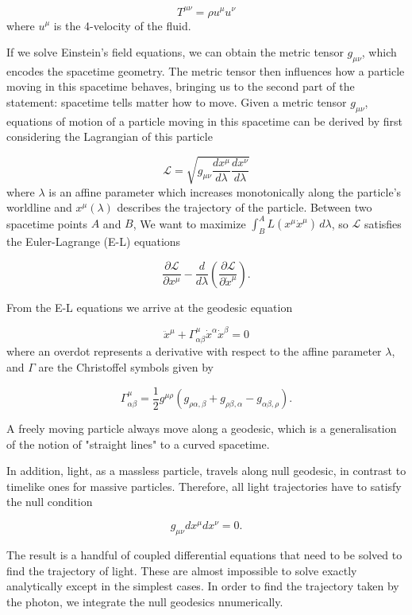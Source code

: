 \begin{equation}
  T^{\mu \nu} = \rho u^{\mu} u^{\nu}
\end{equation}
where $u^{\mu}$ is the 4-velocity of the fluid. 

If we solve Einstein's field equations, we can obtain the metric tensor $g_{\mu \nu}$, which encodes the spacetime geometry. The metric tensor then influences how a particle moving in this spacetime behaves, bringing us to the second part of the statement: spacetime tells matter how to move. Given a metric tensor $g_{\mu \nu}$, equations of motion of a particle moving in this spacetime can be derived by first considering the Lagrangian of this particle

\begin{equation}
  \mathcal{L} = \sqrt{g_{\mu \nu} \frac{dx^{\mu}}{d \lambda} \frac{dx^{\nu}}{d \lambda}}
\end{equation}
where $\lambda$ is an affine parameter which increases monotonically along the particle's worldline and $x^{\mu}(\lambda)$ describes the trajectory of the particle. Between two spacetime points $A$ and $B$, We want to maximize $\int^{A}_{B} L(x^{\mu} \dot{x}^{\mu})\, d \lambda$, so $\mathcal{L}$ satisfies the Euler-Lagrange (E-L) equations

\begin{equation}
  \frac{\partial \mathcal{L}}{\partial x^{\mu}} - \frac{d}{d \lambda}\left ( \frac{\partial \mathcal{L}}{\partial \dot{x}^{\mu}} \right ).
  \label{eq:euler-lagrange-eqn}
\end{equation}

From the E-L equations we arrive at the geodesic equation

\begin{equation}
  \ddot{x}^{\mu} + \Gamma^{\mu}_{\alpha \beta} \dot{x}^{\alpha} \dot{x}^{\beta} = 0 
  \label{eq:geodesic-eqn}
\end{equation}
where an overdot represents a derivative with respect to the affine parameter $\lambda$, and $\Gamma$ are the Christoffel symbols given by

\begin{equation}
  \Gamma^{\mu}_{\alpha \beta} = \frac{1}{2} g^{\mu \rho} (g_{\rho \alpha, \beta} + g_{\rho \beta, \alpha} - g_{\alpha \beta, \rho}).
  \label{eq:christoffels}
\end{equation}

A freely moving particle always move along a geodesic, which is a generalisation of the notion of "straight lines" to a curved spacetime. 

In addition, light, as a massless particle, travels along null geodesic, in contrast to timelike ones for massive particles. Therefore, all light trajectories have to satisfy the null condition

\begin{equation}
  g_{\mu \nu} dx^{\mu} dx^{\nu} = 0.
  \label{eq:null-condition}
\end{equation}

The result is a handful of coupled differential equations that need to be solved to find the trajectory of light. These are almost impossible to solve exactly analytically except in the simplest cases. In order to find the trajectory taken by the photon, we integrate the null geodesics nnumerically. 